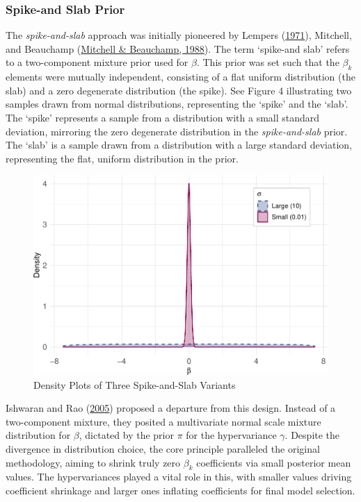 \documentclass[
  11pt,
]{article}
\begin{document}
\subsubsection{Spike-and Slab Prior}

The \emph{spike-and-slab} approach was initially pioneered by Lempers
(\protect\hyperlink{ref-Lempers1971}{1971}), Mitchell, and Beauchamp
(\protect\hyperlink{ref-Mitchell1988}{Mitchell \& Beauchamp, 1988}). The
term `spike-and slab' refers to a two-component mixture prior used for
\(\beta\). This prior was set such that the \(\beta_k\) elements were
mutually independent, consisting of a flat uniform distribution (the
slab) and a zero degenerate distribution (the spike). See Figure 4
illustrating two samples drawn from normal distributions, representing
the `spike' and the `slab'. The `spike' represents a sample from a
distribution with a small standard deviation, mirroring the zero
degenerate distribution in the \emph{spike-and-slab} prior. The `slab'
is a sample drawn from a distribution with a large standard deviation,
representing the flat, uniform distribution in the prior.

\begin{figure}[H]

{\centering \includegraphics[width=0.75\linewidth]{dissertation_files/figure-latex/Spike Slab Priors-1} 

}

\caption{Density Plots of Three Spike-and-Slab Variants}\label{fig:Spike Slab Priors}
\end{figure}

Ishwaran and Rao (\protect\hyperlink{ref-Ishwaran2005}{2005}) proposed a
departure from this design. Instead of a two-component mixture, they
posited a multivariate normal scale mixture distribution for \(\beta\),
dictated by the prior \(\pi\) for the hypervariance \(\gamma\). Despite
the divergence in distribution choice, the core principle paralleled the
original methodology, aiming to shrink truly zero \(\beta_k\)
coefficients via small posterior mean values. The hypervariances played
a vital role in this, with smaller values driving coefficient shrinkage
and larger ones inflating coefficients for final model selection.
\end{document}
